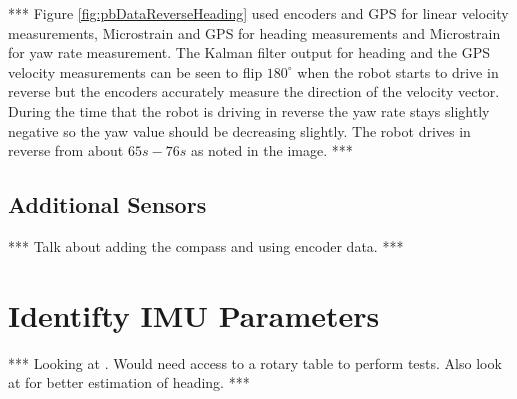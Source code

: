 *** Figure \ref{fig:pbDataReverseHeading} used encoders and GPS for linear velocity measurements, Microstrain and GPS for heading measurements and Microstrain for yaw rate measurement. The Kalman filter output for heading and the GPS velocity measurements can be seen to flip $180^\circ$ when the robot starts to drive in reverse but the encoders accurately measure the direction of the velocity vector. During the time that the robot is driving in reverse the yaw rate stays slightly negative so the yaw value should be decreasing slightly. The robot drives in reverse from about $65 s - 76s$ as noted in the image. ***

\subsection{Additional Sensors}
\label{sec:kfAdditionalSensors}
*** Talk about adding the compass and using encoder data. ***

\section{Identifty IMU Parameters}
\label{sec:identifyimuparams}
*** Looking at \cite{ChungOjeda01}. Would need access to a rotary table to perform tests. Also look at \cite{ParkinsonHeadingEstimation01} for better estimation of heading. ***
